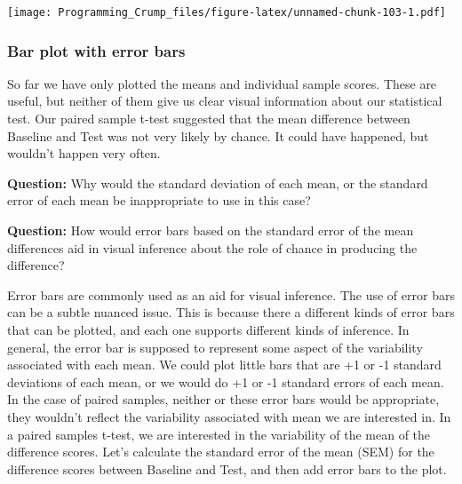 \documentclass[]{book}
\theoremstyle{definition}
\theoremstyle{definition}
\theoremstyle{definition}
\theoremstyle{remark}
\begin{document}
\texttt{[image: Programming\_Crump\_files/figure-latex/unnamed-chunk-103-1.pdf]}

\subsubsection{Bar plot with error bars}\label{bar-plot-with-error-bars}

So far we have only plotted the means and individual sample scores.
These are useful, but neither of them give us clear visual information
about our statistical test. Our paired sample t-test suggested that the
mean difference between Baseline and Test was not very likely by chance.
It could have happened, but wouldn't happen very often.

\textbf{Question:} Why would the standard deviation of each mean, or the
standard error of each mean be inappropriate to use in this case?

\textbf{Question:} How would error bars based on the standard error of
the mean differences aid in visual inference about the role of chance in
producing the difference?

Error bars are commonly used as an aid for visual inference. The use of
error bars can be a subtle nuanced issue. This is because there a
different kinds of error bars that can be plotted, and each one supports
different kinds of inference. In general, the error bar is supposed to
represent some aspect of the variability associated with each mean. We
could plot little bars that are +1 or -1 standard deviations of each
mean, or we would do +1 or -1 standard errors of each mean. In the case
of paired samples, neither or these error bars would be appropriate,
they wouldn't reflect the variability associated with mean we are
interested in. In a paired samples t-test, we are interested in the
variability of the mean of the difference scores. Let's calculate the
standard error of the mean (SEM) for the difference scores between
Baseline and Test, and then add error bars to the plot.
\end{document}

